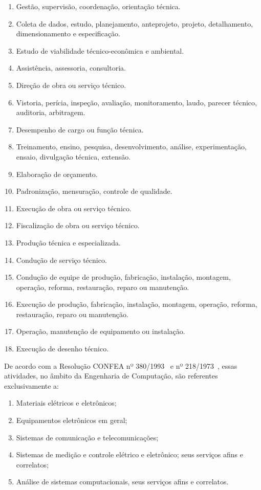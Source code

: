 \begin{enumerate}[label=\Roman*.]
    \item Gestão, supervisão, coordenação, orientação técnica.
    \item Coleta de dados, estudo, planejamento, anteprojeto, projeto, detalhamento, dimensionamento e especificação.
    \item Estudo de viabilidade técnico-econômica e ambiental.
    \item Assistência, assessoria, consultoria.
    \item Direção de obra ou serviço técnico.
    \item Vistoria, perícia, inspeção, avaliação, monitoramento, laudo, parecer técnico, auditoria, arbitragem.
    \item Desempenho de cargo ou função técnica.
    \item Treinamento, ensino, pesquisa, desenvolvimento, análise, experimentação, ensaio, divulgação técnica, extensão.
    \item Elaboração de orçamento.
    \item Padronização, mensuração, controle de qualidade.
    \item Execução de obra ou serviço técnico.
    \item Fiscalização de obra ou serviço técnico.
    \item Produção técnica e especializada.
    \item Condução de serviço técnico.
    \item Condução de equipe de produção, fabricação, instalação, montagem, operação, reforma, restauração, reparo ou manutenção.
    \item Execução de produção, fabricação, instalação, montagem, operação, reforma, restauração, reparo ou manutenção.
    \item Operação, manutenção de equipamento ou instalação.
    \item Execução de desenho técnico.
\end{enumerate}

De acordo com a Resolução CONFEA nº 380/1993~\cite{CONFEA:380:1993} e nº 218/1973~\cite{CONFEA:218:1973}, essas atividades, no âmbito da Engenharia de Computação, são referentes exclusivamente a:

\begin{enumerate}[label=\Roman*.]
    \item Materiais elétricos e eletrônicos;
    \item Equipamentos eletrônicos em geral;
    \item Sistemas de comunicação e telecomunicações;
    \item Sistemas de medição e controle elétrico e eletrônico; seus serviços afins e correlatos;
    \item Análise de sistemas computacionais, seus serviços afins e correlatos.
\end{enumerate}

